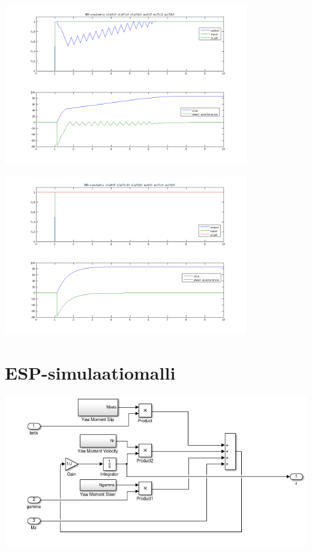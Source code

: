 \documentclass{article}
\newcommand{\kuvaa}[4]{%
	\begin{figure}[h]%
		\centering \texttt{[image: \#2]}%
		\caption{#3 \label{fig:#4}}%
	\end{figure}%
}
\begin{document}
\begin{appendices}
{ \includegraphics[width=0.8\textwidth]{abssim2}

 \includegraphics[width=0.8\textwidth]{abssim3}}

\section{ESP-simulaatiomalli} \label{app:espmodel}
{\centering \includegraphics[width=1.0\textwidth]{espmdl1}

}
\end{appendices}
\end{document}
